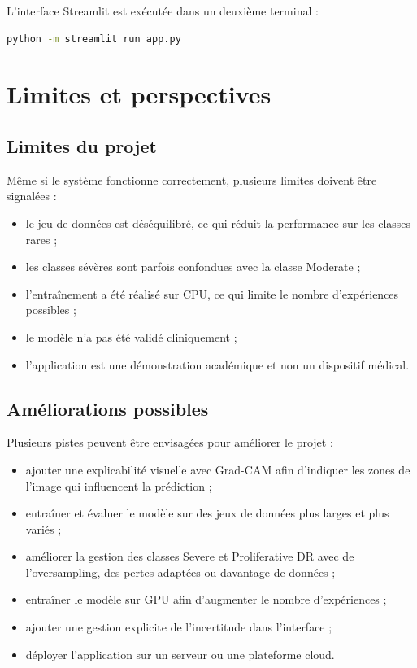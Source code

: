\documentclass[12pt,a4paper]{report}
\begin{document}
L'interface Streamlit est exécutée dans un deuxième terminal :

\begin{lstlisting}[language=bash]
python -m streamlit run app.py
\end{lstlisting}

\chapter{Limites et perspectives}

\section{Limites du projet}
Même si le système fonctionne correctement, plusieurs limites doivent être signalées :
\begin{itemize}
    \item le jeu de données est déséquilibré, ce qui réduit la performance sur les classes rares ;
    \item les classes sévères sont parfois confondues avec la classe Moderate ;
    \item l'entraînement a été réalisé sur CPU, ce qui limite le nombre d'expériences possibles ;
    \item le modèle n'a pas été validé cliniquement ;
    \item l'application est une démonstration académique et non un dispositif médical.
\end{itemize}

\section{Améliorations possibles}
Plusieurs pistes peuvent être envisagées pour améliorer le projet :
\begin{itemize}
    \item ajouter une explicabilité visuelle avec Grad-CAM afin d'indiquer les zones de l'image qui influencent la prédiction ;
    \item entraîner et évaluer le modèle sur des jeux de données plus larges et plus variés ;
    \item améliorer la gestion des classes Severe et Proliferative DR avec de l'oversampling, des pertes adaptées ou davantage de données ;
    \item entraîner le modèle sur GPU afin d'augmenter le nombre d'expériences ;
    \item ajouter une gestion explicite de l'incertitude dans l'interface ;
    \item déployer l'application sur un serveur ou une plateforme cloud.
\end{itemize}
\end{document}
